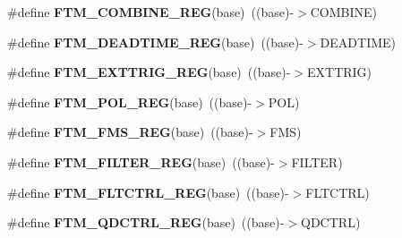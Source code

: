 \begin{DoxyCompactItemize}
\item 
\#define {\bfseries F\+T\+M\+\_\+\+C\+O\+M\+B\+I\+N\+E\+\_\+\+R\+EG}(base)~((base)-\/$>$C\+O\+M\+B\+I\+NE)\hypertarget{group__FTM__Register__Accessor__Macros_ga90eedd735bb2760dfe8aae6615ed7bd5}{}\label{group__FTM__Register__Accessor__Macros_ga90eedd735bb2760dfe8aae6615ed7bd5}

\item 
\#define {\bfseries F\+T\+M\+\_\+\+D\+E\+A\+D\+T\+I\+M\+E\+\_\+\+R\+EG}(base)~((base)-\/$>$D\+E\+A\+D\+T\+I\+ME)\hypertarget{group__FTM__Register__Accessor__Macros_ga674f9acdcb33dc79b3ab26178f0098e8}{}\label{group__FTM__Register__Accessor__Macros_ga674f9acdcb33dc79b3ab26178f0098e8}

\item 
\#define {\bfseries F\+T\+M\+\_\+\+E\+X\+T\+T\+R\+I\+G\+\_\+\+R\+EG}(base)~((base)-\/$>$E\+X\+T\+T\+R\+IG)\hypertarget{group__FTM__Register__Accessor__Macros_gaf89cac15c7c4e4ea83f717b28e00d88f}{}\label{group__FTM__Register__Accessor__Macros_gaf89cac15c7c4e4ea83f717b28e00d88f}

\item 
\#define {\bfseries F\+T\+M\+\_\+\+P\+O\+L\+\_\+\+R\+EG}(base)~((base)-\/$>$P\+OL)\hypertarget{group__FTM__Register__Accessor__Macros_ga9525ab8f8066931fe511722b30888360}{}\label{group__FTM__Register__Accessor__Macros_ga9525ab8f8066931fe511722b30888360}

\item 
\#define {\bfseries F\+T\+M\+\_\+\+F\+M\+S\+\_\+\+R\+EG}(base)~((base)-\/$>$F\+MS)\hypertarget{group__FTM__Register__Accessor__Macros_ga0e52ee8f1d5e149a11c2a41364549bac}{}\label{group__FTM__Register__Accessor__Macros_ga0e52ee8f1d5e149a11c2a41364549bac}

\item 
\#define {\bfseries F\+T\+M\+\_\+\+F\+I\+L\+T\+E\+R\+\_\+\+R\+EG}(base)~((base)-\/$>$F\+I\+L\+T\+ER)\hypertarget{group__FTM__Register__Accessor__Macros_gaf294cd79d00eb02b73a45209922993b7}{}\label{group__FTM__Register__Accessor__Macros_gaf294cd79d00eb02b73a45209922993b7}

\item 
\#define {\bfseries F\+T\+M\+\_\+\+F\+L\+T\+C\+T\+R\+L\+\_\+\+R\+EG}(base)~((base)-\/$>$F\+L\+T\+C\+T\+RL)\hypertarget{group__FTM__Register__Accessor__Macros_ga3526b92dd4ace3ec076ac37ae5f2957f}{}\label{group__FTM__Register__Accessor__Macros_ga3526b92dd4ace3ec076ac37ae5f2957f}

\item 
\#define {\bfseries F\+T\+M\+\_\+\+Q\+D\+C\+T\+R\+L\+\_\+\+R\+EG}(base)~((base)-\/$>$Q\+D\+C\+T\+RL)\hypertarget{group__FTM__Register__Accessor__Macros_gabdac200971bb9e418f543b7a11c02fb5}{}\label{group__FTM__Register__Accessor__Macros_gabdac200971bb9e418f543b7a11c02fb5}


\end{DoxyCompactItemize}
